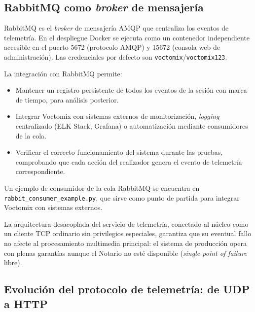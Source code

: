 \subsection{RabbitMQ como \textit{broker} de mensajería}
\label{sec:rabbitmq}

RabbitMQ es el \textit{broker} de mensajería AMQP que centraliza los eventos de telemetría. En
el despliegue Docker se ejecuta como un contenedor independiente accesible en el puerto
5672 (protocolo AMQP) y 15672 (consola web de administración). Las credenciales por
defecto son \texttt{voctomix}/\texttt{voctomix123}.

La integración con RabbitMQ permite:

\begin{itemize}
  \item Mantener un registro persistente de todos los eventos de la sesión con marca de
        tiempo, para análisis posterior.
  \item Integrar Voctomix con sistemas externos de monitorización, \textit{logging}
        centralizado (ELK Stack, Grafana) o automatización mediante consumidores de
        la cola.
  \item Verificar el correcto funcionamiento del sistema durante las pruebas,
        comprobando que cada acción del realizador genera el evento de telemetría
        correspondiente.
\end{itemize}

Un ejemplo de consumidor de la cola RabbitMQ se encuentra en
\texttt{rabbit\_consumer\_example.py}, que sirve como punto de partida para integrar
Voctomix con sistemas externos.

La arquitectura desacoplada del servicio de telemetría, conectado al núcleo como un
cliente TCP ordinario sin privilegios especiales, garantiza que su eventual fallo no
afecte al procesamiento multimedia principal: el sistema de producción opera con plenas
garantías aunque el Notario no esté disponible (\textit{single point of failure} libre).


\subsection{Evolución del protocolo de telemetría: de UDP a HTTP}
\label{sec:evolucion_telemetria}

